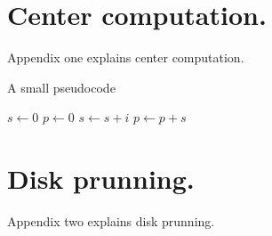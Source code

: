 \documentclass[journal,onecolumn]{IEEEtran}
\begin{document}
\appendices
\section{Center computation.}\label{app:centers}
Appendix one explains center computation.

\begin{algorithm}
\caption{A small pseudocode}
\begin{algorithmic}[1]
\State $s \gets 0$
\State $p \gets 0$
\State $s \gets s + i$
\State $p \gets p + s$
\EndFor
\end{algorithmic}
\end{algorithm}

\section{Disk prunning.}\label{app:disks}
Appendix two explains disk prunning.



\end{document}
